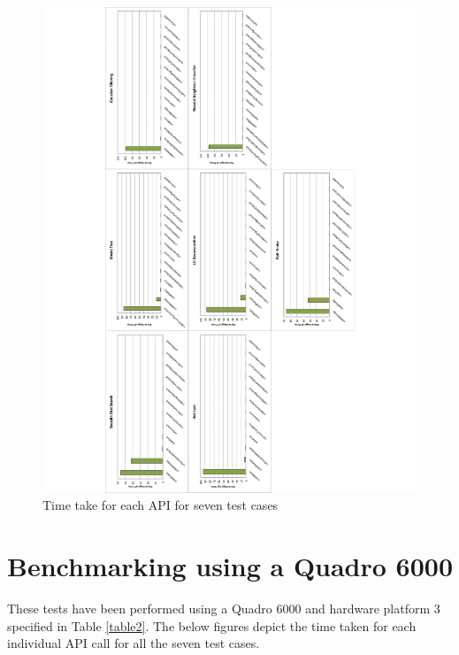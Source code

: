 \documentclass[paper=a4, fontsize=11pt]{scrartcl}
\numberwithin{equation}{section}		%
\numberwithin{figure}{section}			%
\numberwithin{table}{section}				%
\begin{document}
\begin{figure}[!h]
\centering
\includegraphics[scale=0.6]{../imgs/x650.pdf}
\caption{Time take for each API for seven test cases}
\label{fig:x650}
\end{figure}


\newpage
\section{Benchmarking using a Quadro 6000}
These tests have been performed using a Quadro 6000 and hardware platform 3 specified in Table \ref{table2}. The below figures depict the time taken for each individual API call for all the seven test cases.
\end{document}
